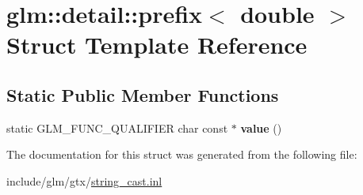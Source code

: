\hypertarget{structglm_1_1detail_1_1prefix_3_01double_01_4}{}\section{glm\+:\+:detail\+:\+:prefix$<$ double $>$ Struct Template Reference}
\label{structglm_1_1detail_1_1prefix_3_01double_01_4}
\subsection*{Static Public Member Functions}
\begin{DoxyCompactItemize}
\item 
\mbox{\label{structglm_1_1detail_1_1prefix_3_01double_01_4_a39aa4646d7de33a2382c92db849d6eb5}} 
static G\+L\+M\+\_\+\+F\+U\+N\+C\+\_\+\+Q\+U\+A\+L\+I\+F\+I\+ER char const  $\ast$ {\bfseries value} ()
\end{DoxyCompactItemize}


The documentation for this struct was generated from the following file\+:\begin{DoxyCompactItemize}
\item 
include/glm/gtx/\hyperlink{string__cast_8inl}{string\+\_\+cast.\+inl}\end{DoxyCompactItemize}
